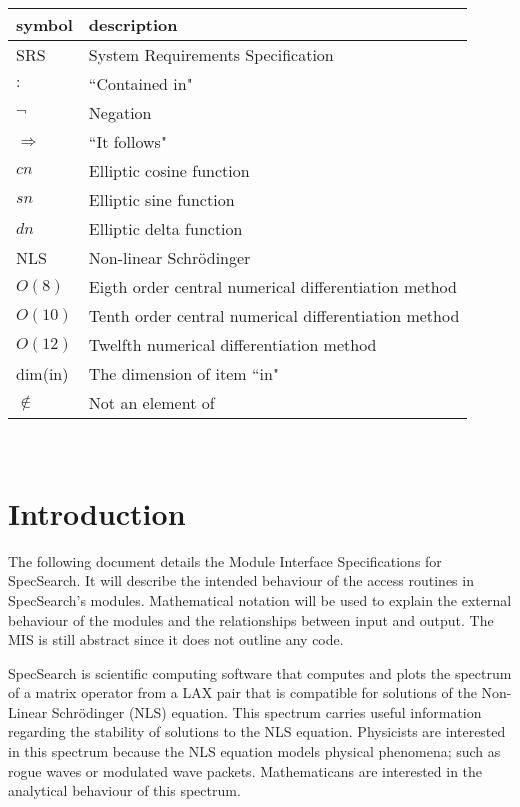 \documentclass[12pt, titlepage]{article}
\begin{document}
\renewcommand{\arraystretch}{1.2}
\begin{tabular}{l l} 
	\toprule		
	\textbf{symbol} & \textbf{description}\\
	\midrule 
	SRS & System Requirements Specification\\ 
	$:$ & ``Contained in"\\ 
	$\neg$ & Negation\\ 
	$\Rightarrow$ & ``It follows"\\ 
	$cn$ & Elliptic cosine function\\ 
	$sn$ & Elliptic sine function\\ 
	$dn$ & Elliptic delta function \\ 
	NLS & Non-linear Schr\"{o}dinger\\  
	$O(8)$ & Eigth order central numerical differentiation method \\ 
	$O(10)$ & Tenth order central numerical differentiation method \\ 
	$O(12)$ & Twelfth numerical differentiation method\\
	dim(in) & The dimension of item ``in" \\
	$\notin$ & Not an element of\\
	\bottomrule
\end{tabular}\\

\newpage

\tableofcontents

\newpage


\section{Introduction}

The following document details the Module Interface Specifications for
SpecSearch. It will describe the intended behaviour of the 
access routines in SpecSearch's modules. Mathematical notation 
will be used to explain the external 
behaviour 
of the modules and the relationships between input and output. The MIS is still 
abstract since it does not outline any code. 

SpecSearch is scientific computing software that computes and plots 
the spectrum of a matrix operator from a LAX pair that is compatible 
for solutions of the Non-Linear Schr\"{o}dinger (NLS) equation. 
This spectrum carries useful information regarding the stability 
of solutions to the NLS equation. Physicists are interested in this spectrum 
because 
the NLS equation models physical phenomena; such as rogue waves or 
modulated wave packets. Mathematicans are interested in the analytical 
behaviour of this spectrum. 
\end{document}
